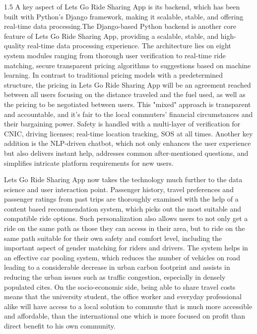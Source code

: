 \begin{spacing}{1.5}
A key aspect of Lets Go Ride Sharing App is its backend, which has been built with Python's Django framework, making it scalable, stable, and offering real-time data processing.The Django-based Python backend is another core feature of Lets Go Ride Sharing App, providing a scalable, stable, and high-quality real-time data processing experience. The architecture lies on eight system modules ranging from thorough user verification to real-time ride matching, secure transparent pricing algorithms to suggestions based on machine learning. In contrast to traditional pricing models with a predetermined structure, the pricing in Lets Go Ride Sharing App will be an agreement reached between all users focusing on the distance traveled and the fuel used, as well as the pricing to be negotiated between users. This "mixed" approach is transparent and accountable, and it's fair to the local commuters' financial circumstances and their bargaining power. Safety is handled with a multi-layer of verification for CNIC, driving licenses; real-time location tracking, SOS at all times. Another key addition is the NLP-driven chatbot, which not only enhances the user experience but also delivers instant help, addresses common after-mentioned questions, and simplifies intricate platform requirements for new users.

Lets Go Ride Sharing App now takes the technology much further to the data science and user interaction point. Passenger history, travel preferences and passenger ratings from past trips are thoroughly examined with the help of a content based recommendation system, which picks out the most suitable and compatible ride options. Such personalization also allows users to not only get a ride on the same path as those they can access in their area, but to ride on the same path suitable for their own safety and comfort level, including the important aspect of gender matching for riders and drivers. The system helps in an effective car pooling system, which reduces the number of vehicles on road leading to a considerable decrease in urban carbon footprint and assists in reducing the urban issues such as traffic congestion, especially in densely populated cites. On the socio-economic side, being able to share travel costs means that the university student, the office worker and everyday professional alike will have access to a local solution to commute that is much more accessible and affordable, than the international one which is more focused on profit than direct benefit to his own community.


\end{spacing}
